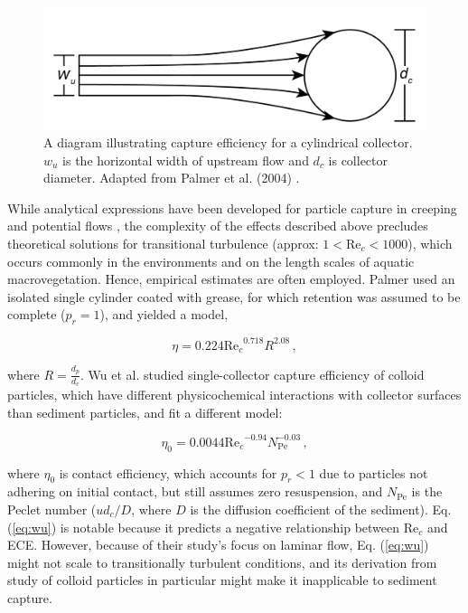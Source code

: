 \documentclass[geosciences,article,submit,moreauthors,pdftex]{Definitions/mdpi}
\newcommand\Rey{\mathrm{Re}}
\newcommand\Pec{\mathrm{Pe}}
\begin{document}
\begin{figure}[H]
\includegraphics[width=5in]{../pics/collectorefficiency.png}
\centering
\caption{A diagram illustrating capture efficiency for a cylindrical collector. $w_u$ is the horizontal width of upstream flow and $d_c$ is collector diameter. Adapted from Palmer et al. (2004) \cite{Palmer_2004}.}
\label{fig:capeff}
\end{figure}

While analytical expressions have been developed for particle capture in creeping and potential flows \cite{lamb1932, langmuir1942filtration, fuchs1965mechanics}, the complexity of the effects described above precludes theoretical solutions for transitional turbulence (approx: $1<\Rey_c<1000$), which occurs commonly in the environments and on the length scales of aquatic macrovegetation. Hence, empirical estimates are often employed. Palmer used an isolated single cylinder coated with grease, for which retention was assumed to be complete ($p_r = 1$), and yielded a model,

\begin{equation}
    \eta=0.224{\Rey_c}^{0.718}R^{2.08}\,,
    \label{eq:palmer}
\end{equation}

\noindent where $R = \frac{d_p}{d_c}$. Wu et al. \cite{Wu_2011} studied single-collector capture efficiency of colloid particles, which have different physicochemical interactions with collector surfaces than sediment particles, and fit a different model:

\begin{equation}
    \eta_0=0.0044{\Rey_c}^{-0.94}N_{\Pec}^{-0.03}\,,
    \label{eq:wu}
\end{equation}

\noindent where $\eta_0$ is contact efficiency, which accounts for $p_r < 1$ due to particles not adhering on initial contact, but still assumes zero resuspension, and $N_{\Pec}$ is the Peclet number ($ud_c/D$, where $D$ is the diffusion coefficient of the sediment). Eq. (\ref{eq:wu}) is notable because it predicts a negative relationship between $\Rey_c$ and ECE. However, because of their study's focus on laminar flow, Eq. (\ref{eq:wu}) might not scale to transitionally turbulent conditions, and its derivation from study of colloid particles in particular might make it inapplicable to sediment capture.
\end{document}
